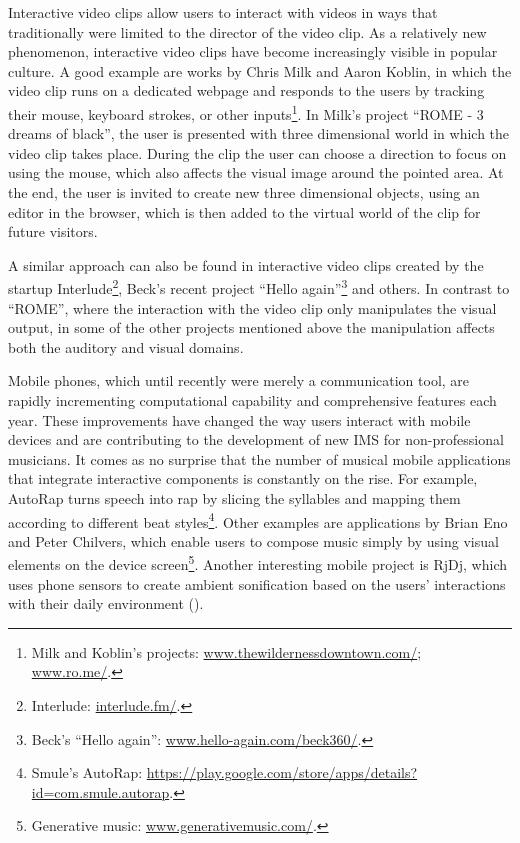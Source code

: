 \documentclass[a4paper,11pt]{article}
\begin{document}
Interactive video clips allow users to interact with videos in ways that traditionally were limited to the director of the video clip.
As a relatively new phenomenon, interactive video clips have become increasingly visible in popular culture.
A good example are works by Chris Milk and Aaron Koblin, in which the video clip runs on a dedicated webpage and responds to the users by tracking their mouse, keyboard strokes, or other inputs\footnote{Milk and Koblin's projects: \href{http://www.thewildernessdowntown.com/}{www.thewildernessdowntown.com/}; \href{http://www.ro.me/}{www.ro.me/}.}.
In Milk's project ``ROME - 3 dreams of black'', the user is presented with three dimensional world in which the video clip takes place.
During the clip the user can choose a direction to focus on using the mouse, which also affects the visual image around the pointed area.
At the end, the user is invited to create new three dimensional objects, using an editor in the browser, which is then added to the virtual world of the clip for future visitors.

A similar approach can also be found in interactive video clips created by the startup Interlude\footnote{Interlude: \href{http://interlude.fm/}{interlude.fm/}.}, Beck's recent project ``Hello again''\footnote{Beck's ``Hello again'': \href{http://www.hello-again.com/beck360/}{www.hello-again.com/beck360/}.} and others.
In contrast to ``ROME'', where the interaction with the video clip only manipulates the visual output, in some of the other projects mentioned above the manipulation affects both the auditory and visual domains.

Mobile phones, which until recently were merely a communication tool, are rapidly incrementing computational capability and comprehensive features each year.
These improvements have changed the way users interact with mobile devices and are contributing to the development of new IMS for non-professional musicians.
It comes as no surprise that the number of musical mobile applications that integrate interactive components is constantly on the rise.
For example, AutoRap turns speech into rap by slicing the syllables and mapping them according to different beat styles\footnote{Smule's AutoRap: \href{https://play.google.com/store/apps/details?id=com.smule.autorap}{https://play.google.com/store/apps/details?id=com.smule.autorap}.}.
Other examples are applications by Brian Eno and Peter Chilvers, which enable users to compose music simply by using visual elements on the device screen\footnote{Generative music: \href{http://www.generativemusic.com/}{www.generativemusic.com/}.}.
Another interesting mobile project is RjDj, which uses phone sensors to create ambient sonification based on the users' interactions with their daily environment (\cite{web:rjdj})\label{rjdj}.
\end{document}
